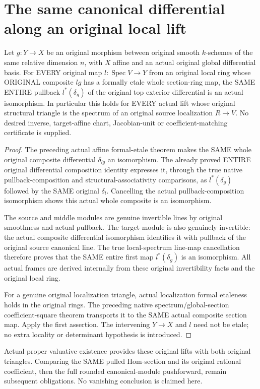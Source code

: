 \section{The same canonical differential along an original local lift}
\label{sec:valuative-canonical-differential}

\begin{theorem}
\label{sc0-valuative-canonical:whole-pulled-differential}
\leanok
Let $g:Y\to X$ be an original morphism between original smooth
$k$-schemes of the same relative dimension $n$, with $X$ affine and
an actual original global differential basis. For EVERY original
map $l:\operatorname{Spec}V\to Y$ from an original local ring whose
ORIGINAL composite $l g$ has a formally etale whole section-ring
map, the SAME ENTIRE pullback $l^*(\delta_g)$ of the original top
exterior differential is an actual isomorphism. In particular this
holds for EVERY actual lift whose original structural triangle is
the spectrum of an original source localization $R\to V$.
No desired inverse, target-affine chart, Jacobian-unit or
coefficient-matching certificate is supplied.
\end{theorem}
\begin{proof}
The preceding actual affine formal-etale theorem makes the SAME
whole original composite differential $\delta_{l g}$ an
isomorphism. The already proved ENTIRE original differential
composition identity expresses it, through the true native
pullback-composition and structural-associativity comparisons, as
$l^*(\delta_g)$ followed by the SAME original $\delta_l$.
Cancelling the actual pullback-composition isomorphism shows this
actual whole composite is an isomorphism.

The source and middle modules are genuine invertible lines by
original smoothness and actual pullback. The target module is
also genuinely invertible: the actual composite differential
isomorphism identifies it with pullback of the original source
canonical line. The true local-spectrum line-map cancellation
therefore proves that the SAME entire first map $l^*(\delta_g)$
is an isomorphism. All actual frames are derived internally from
these original invertibility facts and the original local ring.

For a genuine original localization triangle, actual localization
formal etaleness holds in the original rings. The preceding
native spectrum/global-section coefficient-square theorem
transports it to the SAME actual composite section map. Apply the
first assertion. The intervening $Y\to X$ and $l$ need not be
etale; no extra locality or determinant hypothesis is introduced.
\end{proof}

Actual proper valuative existence provides these original lifts
with both original triangles. Comparing the SAME pulled Hom-section
and its original rational coefficient, then the full rounded
canonical-module pushforward, remain subsequent obligations.
No vanishing conclusion is claimed here.
